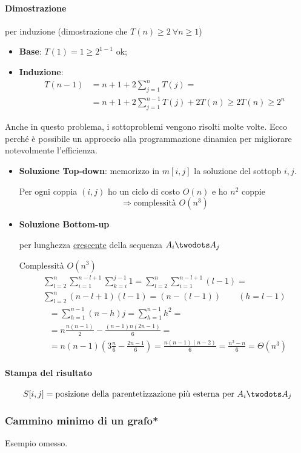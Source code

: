 \paragraph{Dimostrazione} per induzione (dimostrazione che $T(n) \geq 2 \ \forall n \geq 1$)

\begin{itemize}
    \item \textbf{Base}: $T(1) = 1 \geq 2^{1-1}$ ok;
    \item \textbf{Induzione}: 
    \begin{align*}
        T(n-1) & = n+1 +2 \displaystyle\sum_{j=1}^{n} T(j) = \\
        & = n+1+2\displaystyle\sum_{j=1}^{n-1} T(j) + 2T(n) \geq 
        2T(n) \geq 2^n
    \end{align*}
\end{itemize}

Anche in questo problema, i sottoproblemi vengono risolti molte volte. Ecco perch\'e è possibile un approccio alla programmazione
dinamica per migliorare notevolmente l'efficienza.

\begin{itemize}
    \item \textbf{Soluzione Top-down}: memorizzo in $m[i,j]$ la soluzione del sottopb $i,j$.
    
    
    Per ogni coppia $(i,j)$ ho un ciclo di costo $O(n)$ e ho $n^2$ coppie
    $$\Rightarrow \text{complessità } O(n^3)$$

    \item \textbf{Soluzione Bottom-up} \par
    per lunghezza \underline{crescente} della sequenza $A_i \twodots A_j$
    

    Complessità $O(n^3)$
    \begin{multline*}
        \displaystyle\sum_{l=2}^{n}\displaystyle\sum_{i=1}^{n-l+1}
        \displaystyle\sum_{k=i}^{j-1} 1 = 
        \displaystyle\sum_{l=2}^{n}\displaystyle\sum_{i=1}^{n-l+1}(l-1) = \\
        \displaystyle\sum_{l=2}^{n}(n-l+1)(l-1) = \left( n-(l-1) \right) \qquad (h = l-1)
    \end{multline*}
    \begin{align*}
        & = \displaystyle\sum_{h=1}^{n-1} (n-h)j = \displaystyle\sum_{h=1}^{n-1} h^2 = \\
        & = n \frac{n(n-1)}{2} - \frac{(n-1)n(2n-1)}{6} = \\
        & = n(n-1)\left( 3\frac{n}{6} - \frac{2n-1}{6}\right) 
            = \frac{n(n-1)(n-2)}{6} = \frac{n^3-n}{6} = \Theta(n^3)
    \end{align*}
\end{itemize}

\clearpage

\paragraph{Stampa del risultato}
$$S[i,j] = \text{posizione della parentetizzazione più esterna per } A_i \twodots A_j$$


\subsubsection{Cammino minimo di un grafo*} Esempio omesso.